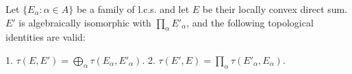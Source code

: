 Let $\{E_{\alpha}: \alpha \in A\}$ be a family of l.c.s. and let $E$ be their locally convex direct sum. $E'$ is algebraically isomorphic with $\prod_{\alpha} E'_{\alpha}$, and the following topological identities are valid:

1. $\tau(E, E') = \bigoplus_{\alpha} \tau(E_{\alpha}, E'_{\alpha})$.
2. $\tau(E', E) = \prod_{\alpha} \tau(E'_{\alpha}, E_{\alpha})$.

